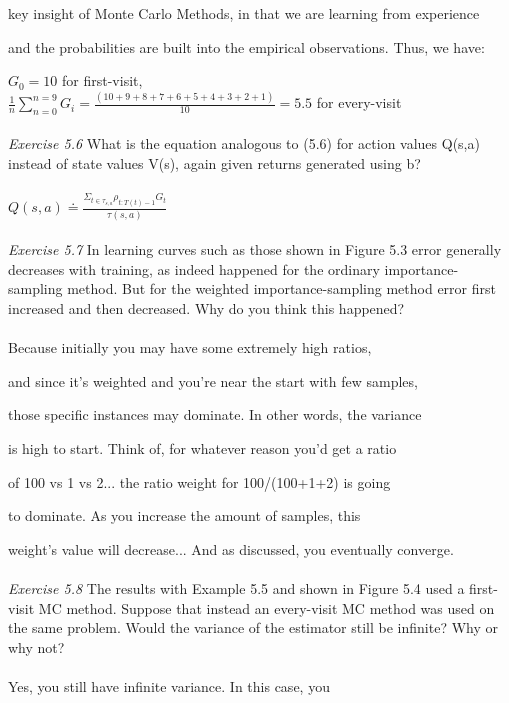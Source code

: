 \documentclass{article}
\begin{document}
key insight of Monte Carlo Methods, in that we are learning from experience 

and the probabilities are built into the empirical observations. Thus, we have:

$G_{0} = 10$ for first-visit, \\

$\frac{1}{n}\sum_{n=0}^{n=9}G_{i} = \frac{(10 + 9 + 8 + 7 + 6 + 5 + 4 + 3 + 2 + 1)}{10} = 5.5$ for every-visit
\\\\
\textit{Exercise 5.6} What is the equation analogous to (5.6) for action values Q(s,a) instead of state values V(s), again given returns generated using b? 
\\
\\
$Q(s,a) \doteq \frac{\Sigma_{t \in \tau_{s,a}}\rho_{t:T(t)-1}G_{t}}{\tau(s,a)}$
\\\\
\textit{Exercise 5.7} In learning curves such as those shown in Figure 5.3 error generally decreases with training, as indeed happened for the ordinary importance-sampling method. But for the weighted importance-sampling method error first increased and then decreased. Why do you think this happened? 
\\
\\

Because initially you may have some extremely high ratios, 

and since it's weighted and you're near the start with few samples, 

those specific instances may dominate. In other words, the variance 

is high to start. Think of, for whatever reason you'd get a ratio 

of 100 vs 1 vs 2... the ratio weight for 100/(100+1+2) is going 

to dominate. As you increase the amount of samples, this

weight's value will decrease... And as discussed, you eventually converge. 
\\\\
\textit{Exercise 5.8} The results with Example 5.5 and shown in Figure 5.4 used a first-visit MC method. Suppose that instead an every-visit MC method was used on the same problem. Would the variance of the estimator still be infinite? Why or why not? 
\\
\\

Yes, you still have infinite variance. In this case, you 
\end{document}
